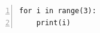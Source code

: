 \documentclass{article}
\begin{document}
\begin{Verbatim}[numbers=left,frame=single]
for i in range(3):
    print(i)
\end{Verbatim}
\end{document}
